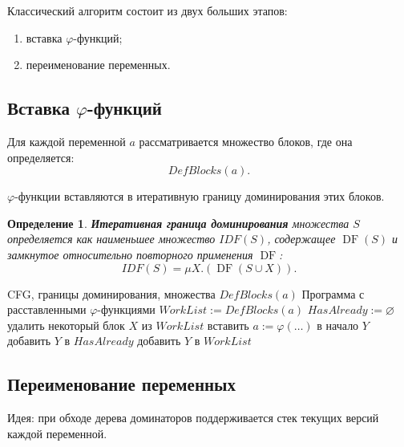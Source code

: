 \documentclass[12pt,a4paper]{article}
\newtheorem{definition}{Определение}
\DeclareMathOperator{\DF}{DF}
\begin{document}
Классический алгоритм состоит из двух больших этапов:
\begin{enumerate}
    \item вставка $\varphi$-функций;
    \item переименование переменных.
\end{enumerate}

\subsection{Вставка $\varphi$-функций}

Для каждой переменной $a$ рассматривается множество блоков, где она определяется:
\[
DefBlocks(a).
\]

$\varphi$-функции вставляются в итеративную границу доминирования этих блоков.

\begin{definition}
\textbf{Итеративная граница доминирования} множества $S$ определяется как наименьшее множество $IDF(S)$, содержащее $\DF(S)$ и замкнутое относительно повторного применения $\DF$:
\[
IDF(S)=\mu X.\left(\DF(S\cup X)\right).
\]
\end{definition}

\begin{algorithm}[H]
\caption{Вставка $\varphi$-функций}
\begin{algorithmic}[1]
\Require CFG, границы доминирования, множества $DefBlocks(a)$
\Ensure Программа с расставленными $\varphi$-функциями
    \State $WorkList := DefBlocks(a)$
    \State $HasAlready := \varnothing$
        \State удалить некоторый блок $X$ из $WorkList$
        \For{каждый $Y\in \DF(X)$}
                \State вставить $a := \varphi(\ldots)$ в начало $Y$
                \State добавить $Y$ в $HasAlready$
                    \State добавить $Y$ в $WorkList$
                \EndIf
            \EndIf
        \EndFor
    \EndWhile
\EndFor
\end{algorithmic}
\end{algorithm}

\subsection{Переименование переменных}

Идея: при обходе дерева доминаторов поддерживается стек текущих версий каждой переменной.
\end{document}
